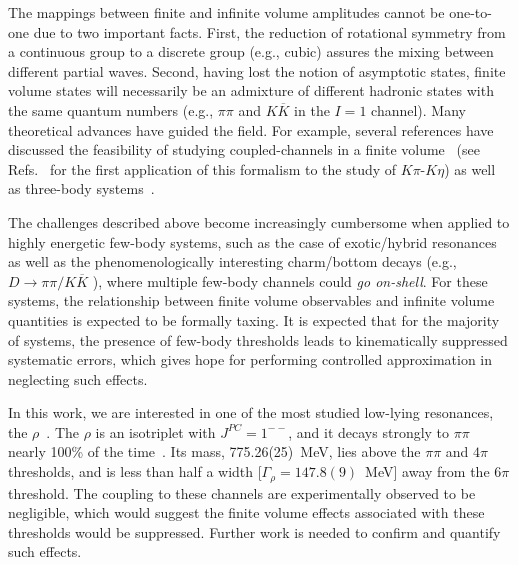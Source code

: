 \documentclass[twocolumn,hyperpdf,
amsmath,amssymb,
aps,prd,10pt,
superscriptaddress,nofootinbib,noeprint,preprintnumbers]{revtex4-1}
\begin{document}
The mappings between finite and infinite volume amplitudes cannot be one-to-one due to two important facts. First, the reduction of rotational symmetry from a continuous group to a discrete group (e.g., cubic) assures the mixing between different partial waves. Second, having lost the notion of asymptotic states, finite volume states will necessarily be an admixture of different hadronic states with the same quantum numbers (e.g., $\pi\pi$ and $K\overline{K}$ in the $I=1$ channel). Many theoretical advances have guided the field. For example, several references have discussed the feasibility of studying coupled-channels in a finite volume~\cite{He:2005ey, Briceno:2012yi, Hansen:2012tf,  Briceno:2014oea} (see Refs.~\cite{Dudek:2014qha, Wilson:2014cna} for the first application of this formalism to the study of $K\pi$-$K\eta$) as well as three-body systems~\cite{Hansen:2014eka, Hansen:2015zga, Briceno:2012rv,  Polejaeva:2012ut}. 
 

The challenges described above become increasingly cumbersome when applied to highly energetic few-body systems, such as the case of exotic/hybrid resonances~\cite{Dudek:2009qf, Dudek:2011tt, Liu:2012ze} as well as the phenomenologically interesting charm/bottom decays (e.g., $D\rightarrow \pi\pi/K\overline{K}$ \cite{Hansen:2012tf, Aaij:2011in}), where multiple few-body channels could \emph{go on-shell}. For these systems, the relationship between finite volume observables and infinite volume quantities is expected to be formally taxing. It is expected that for the majority of systems, the presence of few-body thresholds leads to kinematically suppressed systematic errors, which gives hope for performing controlled approximation in neglecting such effects.

In this work, we are interested in one of the most studied low-lying resonances, the $\rho$~\cite{Metivet:2014bga, Dudek:2012xn, Feng:2010es, Lang:2011mn, Pelissier:2012pi, Aoki:2011yj, Aoki:2007rd}. The $\rho$ is an isotriplet with $J^{PC}=1^{--}$, and it decays strongly to $\pi\pi$ nearly 100\% of the time~\cite{pdg:2014}. Its mass, 775.26(25)~MeV, lies above the $\pi\pi$ and  $4\pi$ thresholds, and is less than half a width [$\Gamma_\rho=147.8(9)$~MeV] away from the $6\pi$ threshold. The coupling to these channels are experimentally observed to be negligible, which would suggest the finite volume effects associated with these thresholds would be suppressed. Further work is needed to confirm and quantify such effects.  %
  
\end{document}
